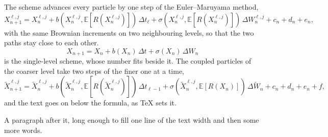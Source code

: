 \documentclass{amsart}
\begin{document}
\thispagestyle{empty}
The scheme advances every particle by one step of the Euler--Maruyama method,
\begin{equation}
  X_{n+1}^{\ell,j} = X_n^{\ell,j} + b(X_n^{\ell,j}, \mathbb E[R(X_n^{\ell,j})])\,\Delta t_{\ell} + \sigma(X_n^{\ell,j}, \mathbb E[R(X_n^{\ell,j})])\,\Delta W_n^{\ell,j} + c_n + d_n + e_n,
\end{equation}
with the same Brownian increments on two neighbouring levels, so that the two paths stay close to each other.
\begin{equation}
  X_{n+1} = X_n + b(X_n)\,\Delta t + \sigma(X_n)\,\Delta W_n
\end{equation}
is the single-level scheme, whose number fits beside it. The coupled particles of the coarser level take two steps of the finer one at a time,
\begin{equation}
  \widetilde X_{n+1}^{\ell,j} = \widetilde X_n^{\ell,j} + b(\widetilde X_n^{\ell,j}, \mathbb E[R(\widetilde X_n^{\ell,j})])\,\Delta t_{\ell-1} + \sigma(\widetilde X_n^{\ell,j}, \mathbb E[R(X_n)])\,\Delta \widetilde W_n + c_n + d_n + e_n + f,
\end{equation}
and the text goes on below the formula, as TeX sets it.

A paragraph after it, long enough to fill one line of the text width and then some more words.
\end{document}
